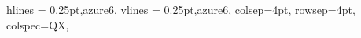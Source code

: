 \begin{appendices}
\begin{longtblr}[caption={Extrait des règles et pratiques de développement logiciel instaurées par Cegedim SRH}, label={tab:dev}]{
    hlines = {0.25pt,azure6},
    vlines = {0.25pt,azure6},
    colsep=4pt,
    rowsep=4pt,
	colspec={QX},
}




\end{longtblr}
\end{appendices}
